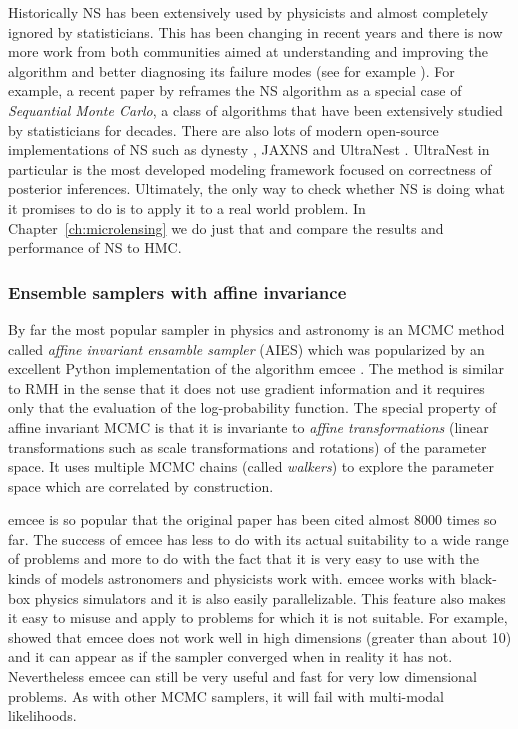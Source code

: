 \documentclass[12pt,dvipsnames]{report}
\begin{document}
Historically NS has been  extensively used by physicists and almost completely 
ignored by statisticians. This has been changing in recent years and there 
is now more work from both communities aimed at understanding and improving the 
algorithm and better diagnosing its failure modes (see for example 
\citet{ arXiv:1407.5459,arXiv:1804.06406,arXiv:1704.03459,arXiv:2101.09675}).
For example, a recent paper by \citet{arXiv:1805.03924}  reframes the NS 
algorithm as a special case of \textsl{Sequantial Monte Carlo}, a class of 
algorithms that have been extensively studied by statisticians for decades.
There are also lots of modern open-source implementations of NS such as 
\textsf{dynesty} \citep{arXiv:1904.02180}, \textsf{JAXNS} \citep{arXiv:2012.15286}
and \textsf{UltraNest} \citep{2021JOSS....6.3001B}. 
\textsf{UltraNest} in particular is the most developed modeling framework 
focused on correctness of posterior inferences. Ultimately, the only way 
to check whether NS is doing what it promises to do is to apply it to a real 
world problem. In Chapter~\ref{ch:microlensing} we do just that and compare 
the results and performance of NS to HMC.

\subsubsection{Ensemble samplers with affine invariance}
By far the most popular sampler in physics and astronomy is an MCMC method 
called \textsl{affine invariant ensamble sampler} (AIES)
\citep{2010CAMCS...5...65G} which was popularized by an excellent \textsf{Python}
implementation of the algorithm \textsf{emcee} 
\citep{arXiv:1202.3665,arXiv:1911.07688}. The method is similar 
to RMH  in the sense that it does not use gradient information and it requires 
only that the evaluation of the log-probability function. The special property 
of affine invariant MCMC is that it is invariante to 
\textsl{affine transformations} (linear transformations such as 
scale transformations and rotations) of the parameter space. It uses multiple 
MCMC chains (called \textsl{walkers}) to explore the parameter space which 
are correlated by construction. 

\textsf{emcee} is so popular that the 
original paper has been cited almost 8000 times so far.  
The success of \textsf{emcee} has less to do with its actual suitability 
to a wide range  of problems and more to do with the fact that it is very easy to use with the 
kinds of models astronomers and physicists work with. \textsf{emcee}  works with
black-box physics simulators and it is also easily parallelizable. 
This feature also makes it easy to misuse and apply to problems for which it is 
not suitable. For example, \citet{arXiv:1509.02230} showed that \textsf{emcee} 
does not work well in high dimensions (greater than about 10) and it can appear 
as if the sampler converged when in reality it has not. Nevertheless 
\textsf{emcee} can still be very useful and fast for very low dimensional 
problems. As with other MCMC samplers, it will fail with multi-modal 
likelihoods.
\end{document}
